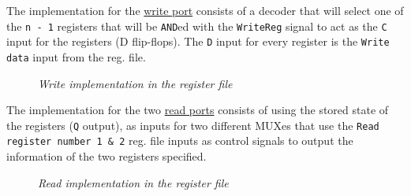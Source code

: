 \documentclass[11pt]{article}
\begin{document}
The implementation for the \underline{write port} consists of a decoder that will select one of the \texttt{n - 1} registers that will be \texttt{AND}ed with the \texttt{WriteReg} signal to act as the \texttt{C} input for the registers (D flip-flops). The \texttt{D} input for every register is the \texttt{Write data} input from the reg. file.

\begin{figure}[htbp]
    \centering
    \caption{\textit{Write implementation in the register file}}
\end{figure}

The implementation for the two \underline{read ports} consists of using the stored state of the registers (\texttt{Q} output), as inputs for two different MUXes that use the \texttt{Read register number 1 \& 2} reg. file inputs as control signals to output the information of the two registers specified.

\begin{figure}[htbp]
    \centering
    \caption{\textit{Read implementation in the register file}}
\end{figure}
\end{document}
